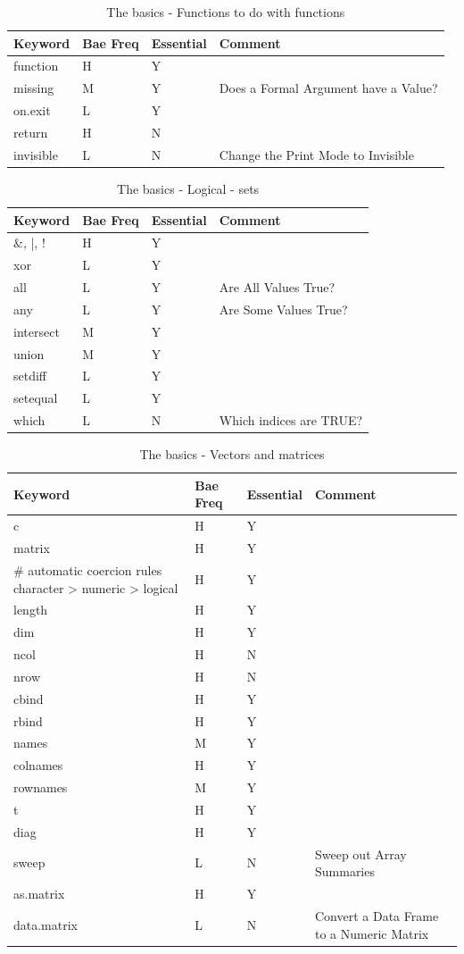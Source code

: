 \documentclass[11pt,]{krantz}
\theoremstyle{definition}
\theoremstyle{definition}
\theoremstyle{remark}
\begin{document}
\begin{longtable}[t]{llll}
\caption{\label{tab:knitchunk5}The basics - Functions to do with functions}\\
\toprule
Keyword & Bae Freq & Essential & Comment\\
\midrule
function & H & Y & \\
missing & M & Y & Does a Formal Argument have a Value?\\
on.exit & L & Y & \\
return & H & N & \\
invisible & L & N & Change the Print Mode to Invisible\\
\bottomrule
\end{longtable}

\begin{longtable}[t]{llll}
\caption{\label{tab:knitchunk6}The basics - Logical - sets }\\
\toprule
Keyword & Bae Freq & Essential & Comment\\
\midrule
\&, |, ! & H & Y & \\
xor & L & Y & \\
all & L & Y & Are All Values True?\\
any & L & Y & Are Some Values True?\\
intersect & M & Y & \\
\addlinespace
union & M & Y & \\
setdiff & L & Y & \\
setequal & L & Y & \\
which & L & N & Which indices are TRUE?\\
\bottomrule
\end{longtable}

\begin{longtable}[t]{llll}
\caption{\label{tab:knitchunk7}The basics - Vectors and matrices}\\
\toprule
Keyword & Bae Freq & Essential & Comment\\
\midrule
c & H & Y & \\
matrix & H & Y & \\
\# automatic coercion rules character > numeric > logical & H & Y & \\
length & H & Y & \\
dim & H & Y & \\
\addlinespace
ncol & H & N & \\
nrow & H & N & \\
cbind & H & Y & \\
rbind & H & Y & \\
names & M & Y & \\
\addlinespace
colnames & H & Y & \\
rownames & M & Y & \\
t & H & Y & \\
diag & H & Y & \\
sweep & L & N & Sweep out Array Summaries\\
\addlinespace
as.matrix & H & Y & \\
data.matrix & L & N & Convert a Data Frame to a Numeric Matrix\\
\bottomrule
\end{longtable}
\end{document}
